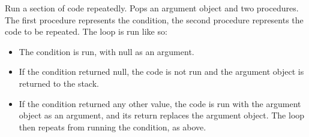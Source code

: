 Run a section of code repeatedly. Pops an argument object and two procedures. The first procedure represents the condition, the second procedure represents the code to be repeated. The loop is run like so:

\begin{itemize}
\item The condition is run, with null as an argument.
\item If the condition returned null, the code is not run and the argument object is returned to the stack.
\item If the condition returned any other value, the code is run with the argument object as an argument, and its return replaces the argument object. The loop then repeats from running the condition, as above.
\end{itemize}
